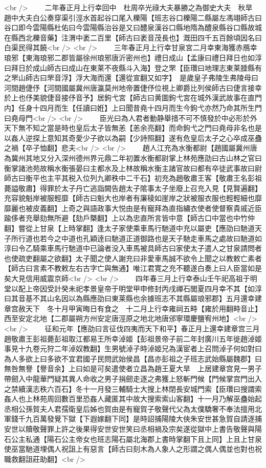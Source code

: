 <br />
　　二年春正月上行幸回中　杜周卒光祿大夫暴勝之為御史大夫　秋旱　趙中大夫白公奏穿渠引涇水首起谷口尾入櫟陽【班志谷口櫟陽二縣屬左馮翊師古曰谷口即今雲陽縣杜佑曰今雲陽縣治谷是又曰醴泉漢谷口縣地隋為醴泉縣谷口縣故城在縣西北櫟音藥】注渭中袤二百里【師古曰袤音茂長也】溉田四千五百餘頃因名曰白渠民得其饒<br />
<br />
　　三年春正月上行幸甘泉宮二月幸東海獲赤鴈幸琅邪【東海琅邪二郡皆屬徐州琅邪唐沂密州也】禮日成山【孟康曰禮日拜日也如淳曰拜日於成山師古曰成山在東莱不夜縣斗入海】登之罘【臣瓚曰地理志東莱腄縣有之罘山師古曰罘音浮】浮大海而還【還從宣翻又如字】　是歲皇子弗陵生弗陵母曰河間趙倢伃【河間國屬冀州唐瀛莫州地帝置倢伃位視上卿爵比列侯師古曰倢言接幸於上也伃美貌倢音接伃音予】居鉤弋宮【師古曰黄圖鉤弋宮在城外漢武故事在直門内】任身十四月而生【任讀曰姙】上曰聞昔堯十四月而生今鉤弋亦然乃命其所生門曰堯母門<br />
<br />
　　臣光曰為人君者動静舉措不可不慎發於中必形於外天下無不知之當是時也皇后太子皆無恙【恙余亮翻】而命鉤弋之門曰堯母非名也是以姦人逆探上意知其奇愛少子欲以為嗣【少詩照翻】遂有危皇后太子之心卒成巫蠱之禍【卒子恤翻】悲夫<br />
<br />
　　趙人江充為水衡都尉【趙國屬冀州唐為冀州其地又分入深州德州界元鼎二年初置水衡都尉掌上林苑應劭曰古山林之官曰衡掌諸池苑故稱水衡張晏曰主都水及上林故稱水衡主諸官故曰都有卒徒武事故曰尉師古曰衡平也主平其税入位列九卿秩中二千石】初充為趙敬肅王客【敬肅王名彭祖薨謚敬肅】得罪於太子丹亡逃詣闕告趙太子隂事太子坐廢上召充入見【見賢遍翻】充容貌魁岸被服輕靡【師古曰魁大也岸者有廉稜如崖岸之狀被服衣服也輕輕細也靡靡麗也被皮義翻】上奇之與語政事大悦由是有寵拜為直指繡衣使者使督察貴戚近臣踰侈者充舉劾無所避【劾戶槩翻】上以為忠直所言皆中意【師古口中當也中竹仲翻】嘗從上甘泉【上時掌翻】逢太子家使乘車馬行馳道中充以屬吏【應劭曰馳道天子所行道也若今之中道也孔穎逹曰馳道正道御路也是天子馳走車馬之處故曰馳道如淳曰令乙騎乘車馬行馳道中已論者没入車馬被具師古曰家使太子遣人之甘泉請問者也使疏吏翻屬之欲翻】太子聞之使人謝充曰非愛車馬誠不欲令上聞之以教敕亡素者【師古曰言素不教敕左右古字亡與無通】唯江君寛之充不聽遂白奏上曰人臣當如是矣大見信用威震京師<br />
<br />
　　四年春三月上行幸泰山壬午祀高祖于明堂以配上帝因受計癸未祀孝景皇帝于明堂甲申修封丙戌禪石閭夏四月幸不其【如淳曰其音基不其山名因以為縣應劭曰東莱縣也余據班志不其縣屬琅邪郡】五月還幸建章宫赦天下　冬十月甲寅晦日有食之　十二月上行幸雍祠五畤【雍於用翻畤音止】西至安定北地【二郡屬朔方州安定唐涇原之地北地唐邠寧環慶鹽宥州地】<br />
<br />
　　征和元年【應劭曰言征伐四夷而天下和平】春正月上還幸建章宫三月趙敬肅王彭祖薨彭祖取江都易王所幸淖姬【彭祖景帝子前二年封廣川五年徙趙淖姬事見十九卷元狩二年淖奴教翻】生男號淖子時淖姬兄為漢宦者上召問淖子何如對曰為人多欲上曰多欲不宜君國子民問武始侯昌【昌亦彭祖之子班志武始縣屬魏郡】曰無咎無譽【譽音余】上曰如是可矣遣使者立昌為趙王夏大旱　上居建章宫見一男子帶劒入中龍華門疑其異人命收之男子捐劒走逐之弗獲上怒斬門候【門候掌宫門出入之禁續漢志秩六百石】冬十一月發三輔騎士大搜上林閉長安城門索【臣瓚曰搜謂索姦人也上林苑周回數百里恐姦人藏匿其中故大搜索索山客翻】十一月乃解巫蠱始起　丞相公孫賀夫人君孺衛皇后姊也賀由是有寵賀子敬聲代父為太僕驕奢不奉法擅用北軍錢千九百萬發覺下獄【下遐嫁翻下同】是時詔捕陽陵大俠朱安世甚急賀自請逐捕安世以贖敬聲罪上許之後果得安世安世笑曰丞相禍及宗矣遂從獄中上書告敬聲與陽石公主私通【陽石公主帝女也班志陽石屬北海郡上書時掌翻下且上同】上且上甘泉使巫當馳道埋偶人祝詛上有惡言【師古曰刻木為人象人之形謂之偶人偶並也對也祝職救翻詛莊助翻】<br />
